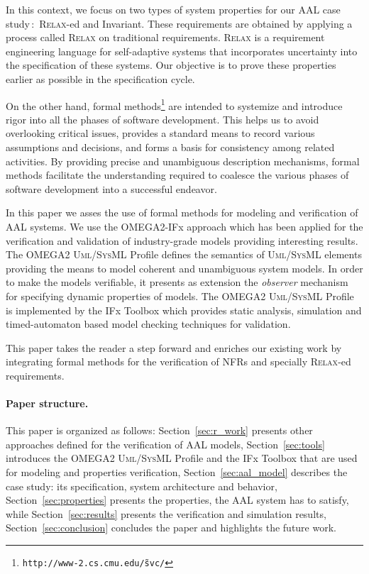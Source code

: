 \documentclass[a4paper,twoside]{article}
\def\myrelax{\textsc{Relax}}                  %
\def\UML{\textsc{Uml}}
\def\SysML{\textsc{SysML}}
\begin{document}
In this context, we focus on two types of system properties for our AAL case study\,:~\myrelax{}-ed and Invariant. These requirements are obtained by applying a process called  \myrelax{} \cite{JWhittle2009} on traditional requirements. \myrelax{}  is  a  requirement  engineering language for self-adaptive systems that incorporates uncertainty into the specification of these systems. Our objective is to prove these properties earlier as possible in the specification cycle.

On the other hand, formal methods\footnote{\texttt{http://www-2.cs.cmu.edu/\~svc/}} are intended to systemize and introduce rigor into all the phases of software development. This helps us to avoid overlooking critical issues, provides a standard means to record various assumptions and decisions, and forms a basis for consistency among related activities. By providing precise and unambiguous description mechanisms, formal methods facilitate the understanding required to coalesce the various phases of software development into a successful endeavor.  

In this paper we asses the use of formal methods for modeling and verification of AAL systems. We use the OMEGA2-IFx approach which has been applied for the verification and validation of industry-grade models \cite{IDragomir2012} providing interesting results. The OMEGA2 \UML{}/\SysML{} Profile \cite{IOber2010} defines the semantics of \UML{}/\SysML{} elements providing the means to model coherent and unambiguous system models. In order to make the models verifiable, it presents as extension the \textit{observer} mechanism for specifying dynamic properties of models. The OMEGA2 \UML{}/\SysML{} Profile is implemented by the IFx Toolbox \cite{IOber2006} which provides static analysis, simulation and timed-automaton based model checking \cite{EMClarke1999} techniques for validation.

This paper takes the reader a step forward and enriches our existing work by integrating formal methods for the verification of NFRs and specially  \myrelax{}-ed requirements.

\paragraph*{Paper structure.} This paper is organized as follows: Section~\ref{sec:r_work} presents other approaches defined for the verification of AAL models, Section~\ref{sec:tools} introduces the OMEGA2 \UML{}/\SysML{} Profile and the IFx Toolbox that are used for modeling and properties verification, Section~\ref{sec:aal_model} describes the case study: its specification, system architecture and behavior, Section~\ref{sec:properties} presents the properties, the AAL system has to satisfy, while Section~\ref{sec:results} presents the verification and simulation results, Section~\ref{sec:conclusion} concludes the paper and highlights the future work.
\end{document}
